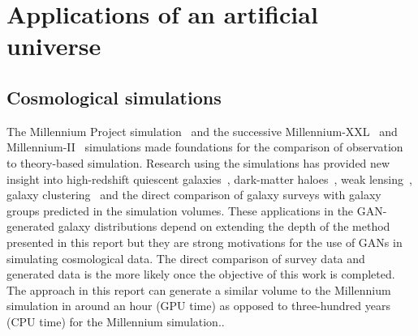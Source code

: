 \documentclass[twocolumn]{article}
\numberwithin{equation}{section}
\begin{document}

\section{Applications of an artificial universe}\label{sec:universe_applications}


\subsection{Cosmological simulations}
The Millennium Project simulation~\cite{millsim} and the successive Millennium-XXL~\cite{millxxlsim} and 
Millennium-II~\cite{mill2sim} simulations made foundations for the comparison of observation to theory-based simulation. 
Research using the simulations has provided new insight into high-redshift quiescent galaxies~\cite{mill_quiescent},
dark-matter haloes~\cite{mill_dm_haloes}, weak lensing~\cite{mill_weak_lensing}, galaxy clustering~\cite{mill_gal_clustering} 
and the direct comparison of galaxy surveys with galaxy groups predicted in the simulation volumes\cite{mill_sdss}. 
These applications in the GAN-generated galaxy distributions depend on extending the depth of the method presented in 
this report but they are strong motivations for the use of GANs in simulating cosmological data. The direct comparison 
of survey data and generated data is the more likely once the objective of this work is completed. The approach in this 
report can generate a similar volume to the Millennium simulation in around an hour (GPU time) as opposed to 
three-hundred years (CPU time) for the Millennium simulation.\footnotemark.


\end{document}
